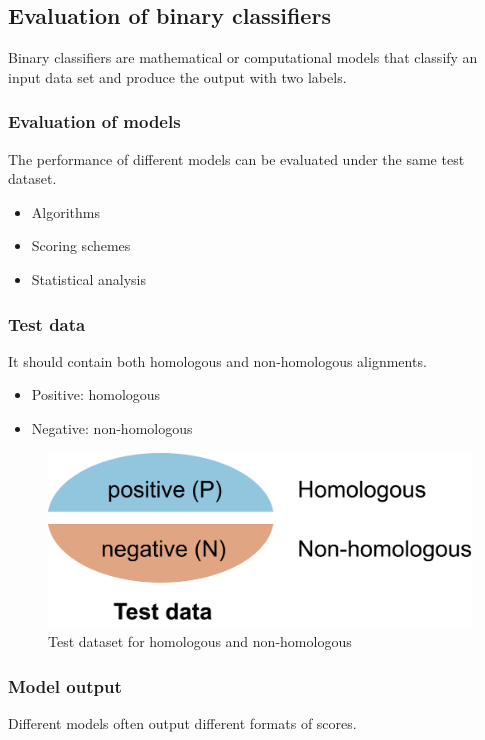 %
%

%
%
\subsection{Evaluation of binary classifiers}
Binary classifiers are mathematical or computational models that classify an input data set and produce the output with two labels. 

%
%
\subsubsection*{Evaluation of models}
The performance of different models can be evaluated under the same test dataset.
\begin{itemize}
\item Algorithms
\item Scoring schemes
\item Statistical analysis
\end{itemize}

%
%
\subsubsection*{Test data}
It should contain both homologous and non-homologous alignments.
\begin{itemize}
\item Positive: homologous
\item Negative: non-homologous
\end{itemize}

\begin{figure}[H]
  \centering
      \includegraphics[width=0.4 \textwidth]{fig07/test_data.png}
  \caption{Test dataset for homologous and non-homologous}
\end{figure}

%
%
\subsubsection*{Model output} 
Different models often output different formats of scores. 

